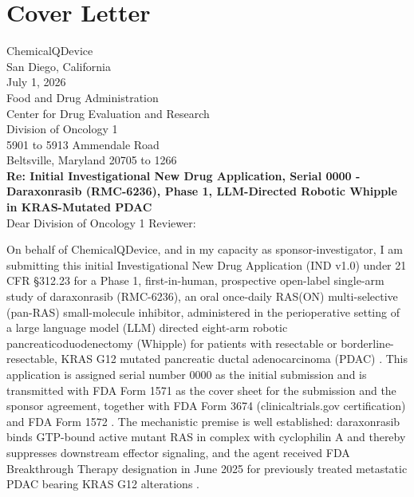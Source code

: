 \section*{Cover Letter}

\noindent ChemicalQDevice \\
San Diego, California \\
July 1, 2026 \\[1em]
Food and Drug Administration \\
Center for Drug Evaluation and Research \\
Division of Oncology 1 \\
5901 to 5913 Ammendale Road \\
Beltsville, Maryland 20705 to 1266 \\[1em]

\noindent\textbf{Re: Initial Investigational New Drug Application, Serial 0000 - Daraxonrasib (RMC-6236), Phase 1, LLM-Directed Robotic Whipple in KRAS-Mutated PDAC} \\[1em]

\noindent Dear Division of Oncology 1 Reviewer:

On behalf of ChemicalQDevice, and in my capacity as sponsor-investigator, I am submitting this initial Investigational New Drug Application (IND v1.0) under 21 CFR \S 312.23 for a Phase 1, first-in-human, prospective open-label single-arm study of daraxonrasib (RMC-6236), an oral once-daily RAS(ON) multi-selective (pan-RAS) small-molecule inhibitor, administered in the perioperative setting of a large language model (LLM) directed eight-arm robotic pancreaticoduodenectomy (Whipple) for patients with resectable or borderline-resectable, KRAS G12 mutated pancreatic ductal adenocarcinoma (PDAC) \cite{daraxwhipple,onpremwhippl}. This application is assigned serial number 0000 as the initial submission and is transmitted with FDA Form 1571 as the cover sheet for the submission and the sponsor agreement, together with FDA Form 3674 (clinicaltrials.gov certification) and FDA Form 1572 \cite{cfr312paiuni}. The mechanistic premise is well established: daraxonrasib binds GTP-bound active mutant RAS in complex with cyclophilin A and thereby suppresses downstream effector signaling, and the agent received FDA Breakthrough Therapy designation in June 2025 for previously treated metastatic PDAC bearing KRAS G12 alterations \cite{daraxwhipple,pdac060s2030}.


